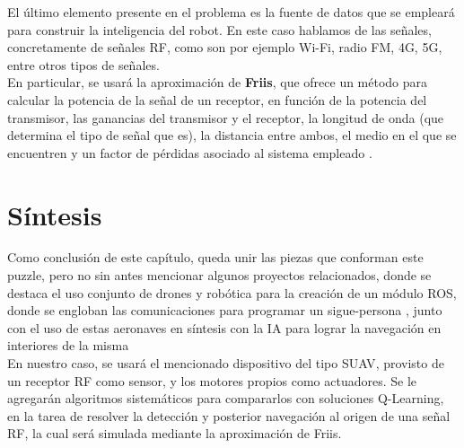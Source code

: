 El último elemento presente en el problema es la fuente de datos que se empleará para construir la inteligencia del robot. En este caso hablamos de las señales, concretamente de señales \ac{RF}, como son por ejemplo Wi-Fi, radio FM, 4G, 5G, entre otros tipos de señales.\\

En particular, se usará la aproximación de \textbf{Friis}, que ofrece un método para calcular la potencia de la señal de un receptor, en función de la potencia del transmisor, las ganancias del transmisor y el receptor, la longitud de onda (que determina el tipo de señal que es), la distancia entre ambos, el medio en el que se encuentren y un factor de pérdidas asociado al sistema empleado \cite{friis-1} \cite{friis-2} \cite{friis-3}.\\

\section{Síntesis}
\label{subsec:sintesis}

Como conclusión de este capítulo, queda unir las piezas que conforman este puzzle, pero no sin antes mencionar algunos proyectos relacionados, donde se destaca el uso conjunto de drones y robótica para la creación de un módulo ROS, donde se engloban las comunicaciones para programar un sigue-persona \cite{tfm-pedro}, junto con el uso de estas aeronaves en síntesis con la \ac{IA} para lograr la navegación en interiores de la misma \cite{paper-ia-dron}\\

En nuestro caso, se usará el mencionado dispositivo del tipo \ac{SUAV}, provisto de un receptor \ac{RF} como sensor, y los motores propios como actuadores. Se le agregarán algoritmos sistemáticos para compararlos con soluciones Q-Learning, en la tarea de resolver la detección y posterior navegación al origen de una señal \ac{RF}, la cual será simulada mediante la aproximación de Friis.\\
